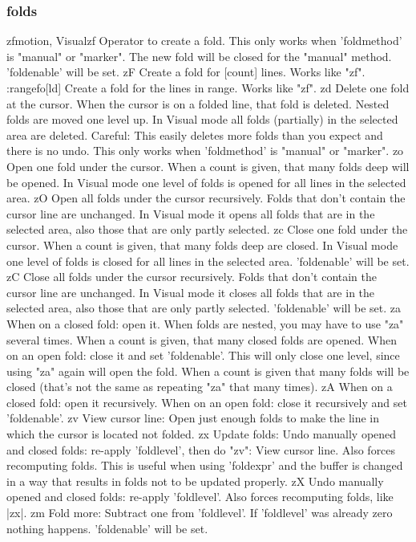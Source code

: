 \documentclass{beamer}
\begin{document}
\begin{frame}
    \frametitle{folds}
    zf{motion}, {Visual}zf	Operator to create a fold.  This only works when 'foldmethod' is "manual" or "marker".  The new fold will be closed for the "manual" method.  'foldenable' will be set.
    zF		Create a fold for [count] lines.  Works like "zf".
    :{range}fo[ld]   Create a fold for the lines in {range}.  Works like "zf".
    zd		Delete one fold at the cursor.  When the cursor is on a folded line, that fold is deleted.  Nested folds are moved one level up.  In Visual mode all folds (partially) in the selected area are deleted.  Careful: This easily deletes more folds than you expect and there is no undo.  This only works when 'foldmethod' is "manual" or "marker".
    zo		Open one fold under the cursor.  When a count is given, that many folds deep will be opened.  In Visual mode one level of folds is opened for all lines in the selected area.
    zO		Open all folds under the cursor recursively.  Folds that don't contain the cursor line are unchanged.  In Visual mode it opens all folds that are in the selected area, also those that are only partly selected.
    zc		Close one fold under the cursor.  When a count is given, that many folds deep are closed.  In Visual mode one level of folds is closed for all lines in the selected area.  'foldenable' will be set.
    zC		Close all folds under the cursor recursively.  Folds that don't contain the cursor line are unchanged.  In Visual mode it closes all folds that are in the selected area, also those that are only partly selected.  'foldenable' will be set.
    za		When on a closed fold: open it.  When folds are nested, you may have to use "za" several times.  When a count is given, that many closed folds are opened.  When on an open fold: close it and set 'foldenable'.  This will only close one level, since using "za" again will open the fold.  When a count is given that many folds will be closed (that's not the same as repeating "za" that many times).
    zA		When on a closed fold: open it recursively.  When on an open fold: close it recursively and set 'foldenable'.
    zv		View cursor line: Open just enough folds to make the line in which the cursor is located not folded.
    zx		Update folds: Undo manually opened and closed folds: re-apply 'foldlevel', then do "zv": View cursor line.  Also forces recomputing folds.  This is useful when using 'foldexpr' and the buffer is changed in a way that results in folds not to be updated properly.
    zX		Undo manually opened and closed folds: re-apply 'foldlevel'.  Also forces recomputing folds, like |zx|.
    zm		Fold more: Subtract one from 'foldlevel'.  If 'foldlevel' was already zero nothing happens.  'foldenable' will be set.
\end{frame}
\end{document}
